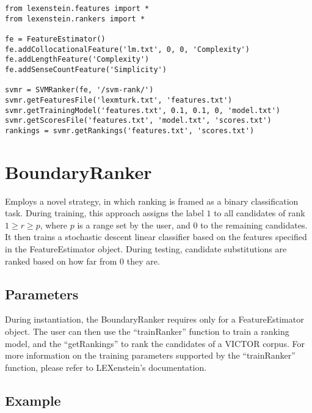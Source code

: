 \begin{lstlisting}
from lexenstein.features import *
from lexenstein.rankers import *

fe = FeatureEstimator()
fe.addCollocationalFeature('lm.txt', 0, 0, 'Complexity')
fe.addLengthFeature('Complexity')
fe.addSenseCountFeature('Simplicity')

svmr = SVMRanker(fe, '/svm-rank/')
svmr.getFeaturesFile('lexmturk.txt', 'features.txt')
svmr.getTrainingModel('features.txt', 0.1, 0.1, 0, 'model.txt')
svmr.getScoresFile('features.txt', 'model.txt', 'scores.txt')
rankings = svmr.getRankings('features.txt', 'scores.txt')
\end{lstlisting}



















\section{BoundaryRanker}

Employs a novel strategy, in which ranking is framed as a binary classification task. During training, this approach assigns the label $1$ to all candidates of rank $1\geq r \geq p$, where $p$ is a range set by the user, and $0$ to the remaining candidates. It then trains a stochastic descent linear classifier based on the features specified in the FeatureEstimator object. During testing, candidate substitutions are ranked based on how far from $0$ they are.

\subsection{Parameters}

During instantiation, the BoundaryRanker requires only for a FeatureEstimator object. The user can then use the ``trainRanker'' function to train a ranking model, and the ``getRankings'' to rank the candidates of a VICTOR corpus. For more information on the training parameters supported by the ``trainRanker'' function, please refer to LEXenstein's documentation.

\subsection{Example}

